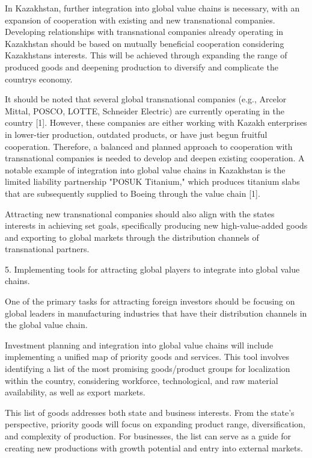 In Kazakhstan, further integration into global value chains is
necessary, with an expansion of cooperation with existing and new
transnational companies. Developing relationships with transnational
companies already operating in Kazakhstan should be based on mutually
beneficial cooperation considering Kazakhstan\textquotesingle s
interests. This will be achieved through expanding the range of produced
goods and deepening production to diversify and complicate the
country\textquotesingle s economy.

It should be noted that several global transnational companies (e.g.,
Arcelor Mittal, POSCO, LOTTE, Schneider Electric) are currently
operating in the country {[}1{]}. However, these companies are either
working with Kazakh enterprises in lower-tier production, outdated
products, or have just begun fruitful cooperation. Therefore, a balanced
and planned approach to cooperation with transnational companies is
needed to develop and deepen existing cooperation. A notable example of
integration into global value chains in Kazakhstan is the limited
liability partnership "POSUK Titanium," which produces titanium slabs
that are subsequently supplied to Boeing through the value chain
{[}1{]}.

Attracting new transnational companies should also align with the
state\textquotesingle s interests in achieving set goals, specifically
producing new high-value-added goods and exporting to global markets
through the distribution channels of transnational partners.

5. Implementing tools for attracting global players to integrate into
global value chains.

One of the primary tasks for attracting foreign investors should be
focusing on global leaders in manufacturing industries that have their
distribution channels in the global value chain.

Investment planning and integration into global value chains will
include implementing a unified map of priority goods and services. This
tool involves identifying a list of the most promising goods/product
groups for localization within the country, considering workforce,
technological, and raw material availability, as well as export markets.

This list of goods addresses both state and business interests. From the
state's perspective, priority goods will focus on expanding product
range, diversification, and complexity of production. For businesses,
the list can serve as a guide for creating new productions with growth
potential and entry into external markets.

